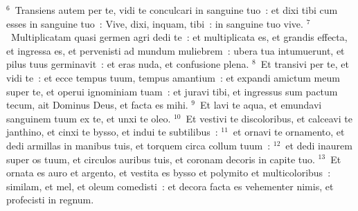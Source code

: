 ${}^{6}$~Transiens autem per te, vidi te conculcari in sanguine tuo~: et dixi tibi cum esses in sanguine tuo~: Vive, dixi, inquam, tibi~: in sanguine tuo vive.
${}^{7}$~Multiplicatam quasi germen agri dedi te~: et multiplicata es, et grandis effecta, et ingressa es, et pervenisti ad mundum muliebrem~: ubera tua intumuerunt, et pilus tuus germinavit~: et eras nuda, et confusione plena.
${}^{8}$~Et transivi per te, et vidi te~: et ecce tempus tuum, tempus amantium~: et expandi amictum meum super te, et operui ignominiam tuam~: et juravi tibi, et ingressus sum pactum tecum, ait Dominus Deus, et facta es mihi.
${}^{9}$~Et lavi te aqua, et emundavi sanguinem tuum ex te, et unxi te oleo.
${}^{10}$~Et vestivi te discoloribus, et calceavi te janthino, et cinxi te bysso, et indui te subtilibus~:
${}^{11}$~et ornavi te ornamento, et dedi armillas in manibus tuis, et torquem circa collum tuum~:
${}^{12}$~et dedi inaurem super os tuum, et circulos auribus tuis, et coronam decoris in capite tuo.
${}^{13}$~Et ornata es auro et argento, et vestita es bysso et polymito et multicoloribus~: similam, et mel, et oleum comedisti~: et decora facta es vehementer nimis, et profecisti in regnum.


